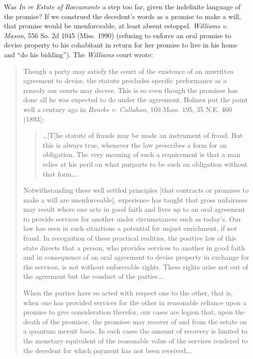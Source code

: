 \item
Was \textit{In re Estate of Roccamonte} a step too far, given the indefinite
language of the promise? If we construed the decedent's words as a promise to
make a will, that promise would be unenforceable, at least absent estoppel.
\emph{Williams v. Mason}, 556 So. 2d 1045 (Miss. 1990) (refusing to enforce an oral
promise to devise property to his cohabitant in return for her promise to live
in his home and ``do his bidding''). The \textit{Williams} court wrote:
\begin{quotation}
Though a party may satisfy the court of the existence of an unwritten agreement
to devise, the statute precludes specific performance as a remedy our courts
may decree. This is so even though the promisee has done all he was expected to
do under the agreement. Holmes put the point well a century ago in \emph{Bourke
v. Callahan}, 160 Mass. 195, 35 N.E. 460 (1893):
\begin{quote}
\dots [T]he statute of frauds may be made an instrument of fraud. But this is
always true, whenever the law prescribes a form for an obligation. The very
meaning of such a requirement is that a man relies at his peril on what
purports to be such an obligation without that form\dots.
\end{quote}
Notwithstanding these well settled principles [that contracts or promises to
make a will are unenforceable], experience has taught that gross unfairness may
result where one acts in good faith and lives up to an oral agreement to
provide services for another under circumstances such as today's. Our law has
seen in such situations a potential for unjust enrichment, if not fraud. In
recognition of these practical realities, the positive law of this state
directs that a person, who provides services to another in good faith and in
consequence of an oral agreement to devise property in exchange for the
services, is not without enforceable rights. These rights arise not out of the
agreement but the conduct of the parties\dots.

When the parties have so acted with respect one to the other, that is, when one
has provided services for the other in reasonable reliance upon a promise to
give consideration therefor, our cases are legion that, upon the death of the
promisor, the promisee may recover of and from the estate on a quantum meruit
basis. In such cases the amount of recovery is limited to the monetary
equivalent of the reasonable value of the services rendered to the decedent for
which payment has not been received\dots.


\end{quotation}
